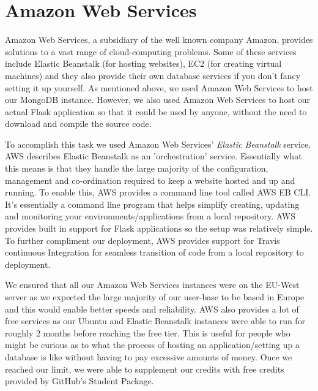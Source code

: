 \section{Amazon Web Services}
Amazon Web Services, a subsidiary of the well known company Amazon, provides solutions to a vast range of cloud-computing problems. Some of these services include Elastic Beanstalk (for hosting websites), EC2 (for creating virtual machines) and they also provide their own database services if you don't fancy setting it up yourself.
As mentioned above, we used Amazon Web Services to host our MongoDB instance. However, we also used Amazon Web Services to host our actual Flask application so that it could be used by anyone, without the need to download and compile the source code.

To accomplish this task we used Amazon Web Services' \textit{Elastic Beanstalk} service. AWS describes Elastic Beanstalk as an 'orchestration' service. Essentially what this means is that they handle the large majority of the configuration, management and co-ordination required to keep a website hosted and up and running. To enable this, AWS provides a command line tool called AWS EB CLI. It's essentially a command line program that helps simplify creating, updating and monitoring your environments/applications from a local repository. 
AWS provides built in support for Flask applications so the setup was relatively simple. To further compliment our deployment, AWS provides support for Travis continuous Integration for seamless transition of code from a local repository to deployment.

We ensured that all our Amazon Web Services instances were on the EU-West server as we expected the large majority of our user-base to be based in Europe and this would enable better speeds and reliability. AWS also provides a lot of free services as our Ubuntu and Elastic Beanstalk instances were able to run for roughly 2 months before reaching the free tier. This is useful 
for people who might be curious as to what the process of hosting an application/setting up a database is like without having to pay excessive amounts of money. Once we reached our limit, we were able to supplement our credits with free credits provided by GitHub's Student Package. 

